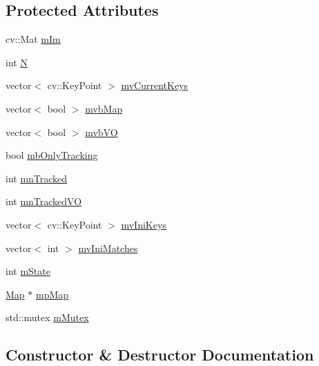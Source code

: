 \subsection*{Protected Attributes}
\begin{DoxyCompactItemize}
\item 
cv\+::\+Mat \mbox{\hyperlink{class_o_r_b___s_l_a_m2_1_1_frame_drawer_a2b405554be1a48ade50055af97c2c2c9}{m\+Im}}
\item 
int \mbox{\hyperlink{class_o_r_b___s_l_a_m2_1_1_frame_drawer_adbc9489192f5485ece966b0d6d589e47}{N}}
\item 
vector$<$ cv\+::\+Key\+Point $>$ \mbox{\hyperlink{class_o_r_b___s_l_a_m2_1_1_frame_drawer_a35ec8c5aea5cffee69ac5cec6abb5871}{mv\+Current\+Keys}}
\item 
vector$<$ bool $>$ \mbox{\hyperlink{class_o_r_b___s_l_a_m2_1_1_frame_drawer_aa7d745757f0a81f8460236036b837b0e}{mvb\+Map}}
\item 
vector$<$ bool $>$ \mbox{\hyperlink{class_o_r_b___s_l_a_m2_1_1_frame_drawer_ab47bccbb2ddfa65221a968736a6bd092}{mvb\+VO}}
\item 
bool \mbox{\hyperlink{class_o_r_b___s_l_a_m2_1_1_frame_drawer_ad7087ccda3d514be5e0132f889c3e949}{mb\+Only\+Tracking}}
\item 
int \mbox{\hyperlink{class_o_r_b___s_l_a_m2_1_1_frame_drawer_ae111426e790338d9f5f4556434716919}{mn\+Tracked}}
\item 
int \mbox{\hyperlink{class_o_r_b___s_l_a_m2_1_1_frame_drawer_ab1cbcb7a1443ceaaafaaf5537927f184}{mn\+Tracked\+VO}}
\item 
vector$<$ cv\+::\+Key\+Point $>$ \mbox{\hyperlink{class_o_r_b___s_l_a_m2_1_1_frame_drawer_a890a8bd44745b16024e1d7e82ac1d3f0}{mv\+Ini\+Keys}}
\item 
vector$<$ int $>$ \mbox{\hyperlink{class_o_r_b___s_l_a_m2_1_1_frame_drawer_a158a3ca6cab99c6bb691a7537212764b}{mv\+Ini\+Matches}}
\item 
int \mbox{\hyperlink{class_o_r_b___s_l_a_m2_1_1_frame_drawer_a00cc5f188d53b4d8f767f339515cc8e3}{m\+State}}
\item 
\mbox{\hyperlink{class_o_r_b___s_l_a_m2_1_1_map}{Map}} $\ast$ \mbox{\hyperlink{class_o_r_b___s_l_a_m2_1_1_frame_drawer_a48374a37e72786b2e64c15c0ec13ce7b}{mp\+Map}}
\item 
std\+::mutex \mbox{\hyperlink{class_o_r_b___s_l_a_m2_1_1_frame_drawer_a1425b923def88314bb43eddf3eee4ddb}{m\+Mutex}}
\end{DoxyCompactItemize}


\subsection{Constructor \& Destructor Documentation}
\mbox{\label{class_o_r_b___s_l_a_m2_1_1_frame_drawer_add0e1c3734c200a959d8ed9f225223db}} 
